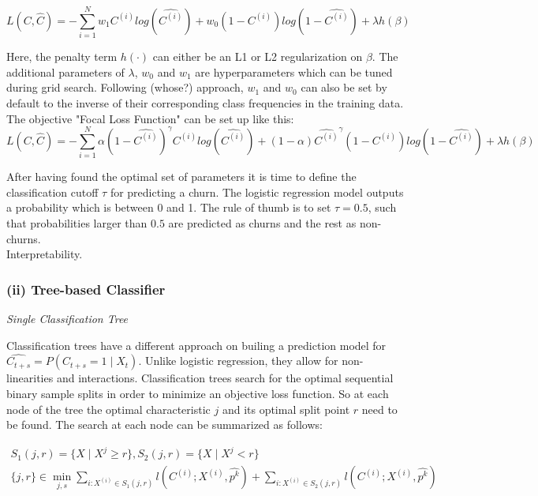 \documentclass[12pt,titlepage]{article}
\begin{document}
\begin{equation} \label{loss_fct_wl}
    L(C, \widehat{C}) = -\sum_{i=1}^{N}w_{1}C^{(i)}log(\widehat{C^{(i)}}) + w_{0}(1 - C^{(i)})log(1 - \widehat{C^{(i)}}) + \lambda h(\beta)
\end{equation}

Here, the penalty term $h(\cdot)$ can either be an L1 or L2 regularization on $\beta$. The additional parameters of $\lambda$, $w_{0}$ and $w_{1}$ are hyperparameters which can be tuned during grid search. Following (whose?) approach, $w_{1}$ and $w_{0}$ can also be set by default to the inverse of their corresponding class frequencies in the training data. \\
The objective "Focal Loss Function" can be set up like this: \\

\begin{equation} \label{loss_fct_fl}
    L(C, \widehat{C}) = -\sum_{i=1}^{N}\alpha(1 - \widehat{C^{(i)}})^{\gamma}C^{(i)}log(\widehat{C^{(i)}}) + (1 - \alpha)\widehat{C^{(i)}}^{\gamma}(1 - C^{(i)})log(1 - \widehat{C^{(i)}}) + \lambda h(\beta)
\end{equation}

After having found the optimal set of parameters it is time to define the classification cutoff $\tau$ for predicting a churn. The logistic regression model outputs a probability which is between 0 and 1. The rule of thumb is to set $\tau = 0.5$, such that probabilities larger than $0.5$ are predicted as churns and the rest as non-churns. \\
Interpretability. \\

\subsubsection*{(ii) Tree-based Classifier}

\textit{Single Classification Tree}

Classification trees have a different approach on builing a prediction model for $\widehat{C_{t+s}} = P(C_{t+s}=1\mid X_{t})$. Unlike logistic regression, they allow for non-linearities and interactions. Classification trees search for the optimal sequential binary sample splits in order to minimize an objective loss function. So at each node of the tree the optimal characteristic $j$ and its optimal split point $r$ need to be found. The search at each node can be summarized as follows:

\begin{equation} \label{dec_tree}
    \begin{aligned}
        S_{1}(j, r) = \{X\mid X^{j}\geq r\} , S_{2}(j, r) = \{X\mid X^{j}< r\} \\
        \{j, r\} \in \min_{j, s} \sum_{i:X^{(i)}\in S_{1}(j, r)}l(C^{(i)}; X^{(i)}, \widehat{p^{k}}) + \sum_{i:X^{(i)}\in S_{2}(j, r)}l(C^{(i)}; X^{(i)}, \widehat{p^{k}})
    \end{aligned}
\end{equation}
\end{document}
